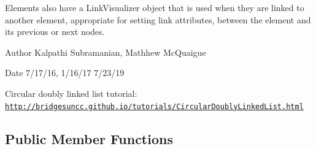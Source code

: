 Elements also have a Link\+Visualizer object that is used when they are linked to another element, appropriate for setting link attributes, between the element and its previous or next nodes.

\begin{DoxyAuthor}{Author}
Kalpathi Subramanian, Mathhew Mc\+Quaigue
\end{DoxyAuthor}
\begin{DoxyDate}{Date}
7/17/16, 1/16/17 7/23/19
\end{DoxyDate}
Circular doubly linked list tutorial\+: \href{http://bridgesuncc.github.io/tutorials/CircularDoublyLinkedList.html}{\tt http\+://bridgesuncc.\+github.\+io/tutorials/\+Circular\+Doubly\+Linked\+List.\+html} \subsection*{Public Member Functions}
